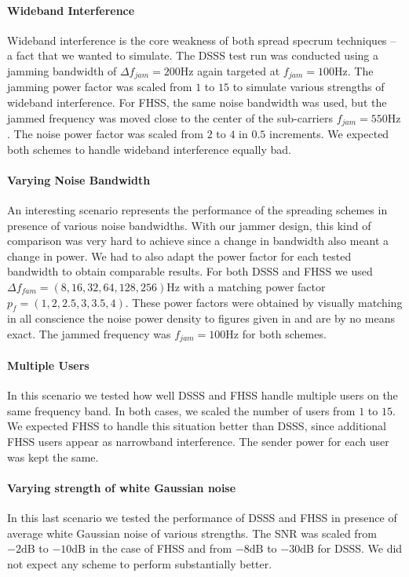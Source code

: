 	\paragraph{Wideband Interference}
	Wideband interference is the core weakness of both spread specrum techniques -- a fact that we wanted to simulate. The DSSS test run was conducted using a jamming bandwidth of $\Delta f_{jam} = 200\text{Hz}$ again targeted at $f_{jam} = 100\text{Hz}$. The jamming power factor was scaled from $1$ to $15$ to simulate various strengths of wideband interference. For FHSS, the same noise bandwidth was used, but the jammed frequency was moved close to the center of the sub-carriers $f_{jam} = 550\text{Hz}$. The noise power factor was scaled from $2$ to $4$ in $0.5$ increments. We expected both schemes to handle wideband interference equally bad.
	
	\paragraph{Varying Noise Bandwidth}	
	An interesting scenario represents the performance of the spreading schemes in presence of various noise bandwidths. With our jammer design, this kind of comparison was very hard to achieve since a change in bandwidth also meant a change in power. We had to also adapt the power factor for each tested bandwidth to obtain comparable results. For both DSSS and FHSS we used $\Delta f_{fam} = (8,16,32,64,128,256)\text{Hz}$ with a matching power factor $p_f = (1,2,2.5,3,3.5,4)$. These power factors were obtained by visually matching in all conscience the noise power density to figures given in \cite{ISS} and are by no means exact. The jammed frequency was $f_{jam}=100\text{Hz}$ for both schemes. 
	
	\paragraph{Multiple Users}
	In this scenario we tested how well DSSS and FHSS handle multiple users on the same frequency band. In both cases, we scaled the number of users from $1$ to $15$. We expected FHSS to handle this situation better than DSSS, since additional FHSS users appear as narrowband interference. The sender power for each user was kept the same.
	
	\paragraph{Varying strength of white Gaussian noise}
	In this last scenario we tested the performance of DSSS and FHSS in presence of average white Gaussian noise of various strengths. The SNR was scaled from $-2\text{dB}$ to $-10\text{dB}$ in the case of FHSS and from $-8\text{dB}$ to $-30\text{dB}$ for DSSS. We did not expect any scheme to perform substantially better.
	
	
	
